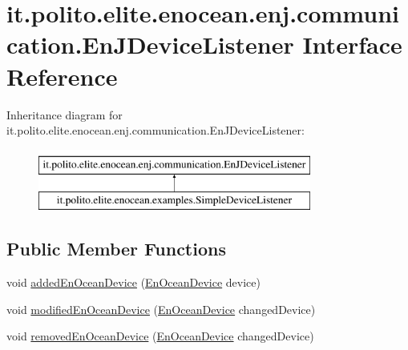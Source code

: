\hypertarget{interfaceit_1_1polito_1_1elite_1_1enocean_1_1enj_1_1communication_1_1_en_j_device_listener}{}\section{it.\+polito.\+elite.\+enocean.\+enj.\+communication.\+En\+J\+Device\+Listener Interface Reference}
\label{interfaceit_1_1polito_1_1elite_1_1enocean_1_1enj_1_1communication_1_1_en_j_device_listener}
Inheritance diagram for it.\+polito.\+elite.\+enocean.\+enj.\+communication.\+En\+J\+Device\+Listener\+:\begin{figure}[H]
\begin{center}
\leavevmode
\includegraphics[height=2.000000cm]{interfaceit_1_1polito_1_1elite_1_1enocean_1_1enj_1_1communication_1_1_en_j_device_listener}
\end{center}
\end{figure}
\subsection*{Public Member Functions}
\begin{DoxyCompactItemize}
\item 
void \hyperlink{interfaceit_1_1polito_1_1elite_1_1enocean_1_1enj_1_1communication_1_1_en_j_device_listener_a4d573c1f79d5f174ad22f8ce999c972d}{added\+En\+Ocean\+Device} (\hyperlink{classit_1_1polito_1_1elite_1_1enocean_1_1enj_1_1model_1_1_en_ocean_device}{En\+Ocean\+Device} device)
\item 
void \hyperlink{interfaceit_1_1polito_1_1elite_1_1enocean_1_1enj_1_1communication_1_1_en_j_device_listener_a90117812e489a4b4b7d9da1249e6ab90}{modified\+En\+Ocean\+Device} (\hyperlink{classit_1_1polito_1_1elite_1_1enocean_1_1enj_1_1model_1_1_en_ocean_device}{En\+Ocean\+Device} changed\+Device)
\item 
void \hyperlink{interfaceit_1_1polito_1_1elite_1_1enocean_1_1enj_1_1communication_1_1_en_j_device_listener_aca9114b95c51e8a4afaa4240dddf0a7d}{removed\+En\+Ocean\+Device} (\hyperlink{classit_1_1polito_1_1elite_1_1enocean_1_1enj_1_1model_1_1_en_ocean_device}{En\+Ocean\+Device} changed\+Device)
\end{DoxyCompactItemize}


